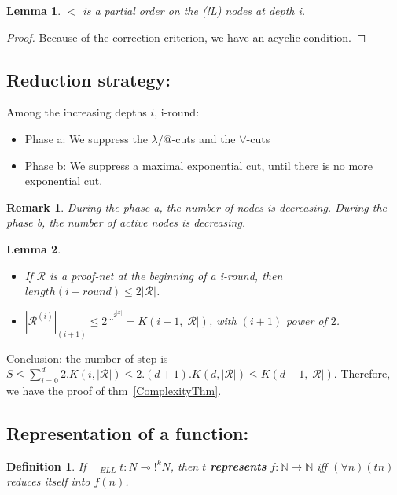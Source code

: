 \documentclass[a4paper,10pt]{article}
\newcommand{\limpl}{\multimap}  %
\newcommand{\pnet}{\mathcal{R}} %
\newcommand{\Nset}{\mathbb{N}} %
\newtheorem{definition}{Definition}
\newtheorem{lem}{Lemma}
\newtheorem{rmk}{Remark}
\begin{document}
\begin{lem}
	$<$ is a partial order on the (!L) nodes at depth i.
\end{lem}
\begin{proof}
	Because of the correction criterion, we have an acyclic condition.
\end{proof}

\subsection{Reduction strategy:}
 Among the increasing depths $i$, i-round:
\begin{itemize}
	\item Phase a: We suppress the $\lambda/@$-cuts and the $\forall$-cuts
	\item Phase b: We suppress a maximal exponential cut, until there is no more exponential cut.
\end{itemize}

\begin{rmk}
	During the phase a, the number of nodes is decreasing. During the phase b, the number of active nodes is decreasing.
\end{rmk}

\begin{lem}
	\begin{itemize}
		\item If $\pnet$ is a proof-net at the beginning of a i-round, then $length(i-round) \leq 2 |\pnet|$.
		\item $|\pnet^{(i)}|_{(i+1)} \leq 2^{\dots^{2^{|\pnet|}}} = K(i+1, |\pnet|)$, with $(i+1)$ power of $2$.
	\end{itemize}
\end{lem}

 Conclusion: the number of step is $S \leq \sum_{i=0}^{d} 2.K(i,|\pnet|) \leq 2.(d+1).K(d,|\pnet|) \leq K(d+1,|\pnet|)$. Therefore, we have the proof of thm~\ref{ComplexityThm}.

\subsection{Representation of a function:}

\begin{definition}
If $\vdash_{ELL} t: N \limpl !^{k} N$, then $t$ \textbf{represents} $f:\Nset \mapsto \Nset$ iff $(\forall n) (t n)$ reduces itself into $f(n)$.
\end{definition}
\end{document}
